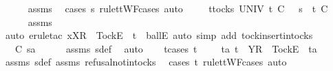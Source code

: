 \begin{isabellebody}
\ \ \ \ \isamarkupfalse%
\ assms{\isacharparenleft}{}{\isacharparenright}\ \isamarkupfalse%
\ {\isacharparenleft}cases\ s{}{\isacharprime}\ rule{\isacharcolon}ttWF{\isachardot}cases{\isacharcomma}\ auto{\isacharparenright}\isanewline
\ \ \isamarkupfalse%
\ {}{\isacharcolon}\ {\isachardoublequoteopen}{\isasymforall}t{\isasymin}tocks\ UNIV{\isachardot}\ t\ {\isasymle}\isactrlsub C\ {\isasymsigma}\ {\isacharat}\ s{}\ {\isasymlongrightarrow}\ t\ {\isasymle}\isactrlsub C\ {\isasymsigma}{\isachardoublequoteclose}\isanewline
\ \ \ \ \isamarkupfalse%
\ assms{\isacharparenleft}{}{\isacharparenright}\ \isamarkupfalse%
\ {\isacharparenleft}auto{\isacharcomma}\ erule{\isacharunderscore}tac\ x{\isacharequal}{\isachardoublequoteopen}{\isacharbrackleft}X{\isacharbrackright}\isactrlsub R\ {\isacharhash}\ {\isacharbrackleft}Tock{\isacharbrackright}\isactrlsub E\ {\isacharhash}\ t{\isachardoublequoteclose}\ \ ballE{\isacharcomma}\ auto\ simp\ add{\isacharcolon}\ tock{\isacharunderscore}insert{\isacharunderscore}in{\isacharunderscore}tocks{\isacharparenright}\isanewline
\ \ \isamarkupfalse%
\ {}{\isacharcolon}\ {\isachardoublequoteopen}{\isasymsigma}\ {\isasymsubseteq}\isactrlsub C\ s{}{\isacharprime}a{\isachardoublequoteclose}\isanewline
\ \ \ \ \isamarkupfalse%
\ assms{\isacharparenleft}{}{\isacharparenright}\ s{}{\isacharprime}{\isacharunderscore}def\ \isamarkupfalse%
\ auto\isanewline
\ \ \isamarkupfalse%
\ t{\isacharunderscore}cases{\isacharcolon}\ {\isachardoublequoteopen}t\ {\isacharequal}\ {\isacharbrackleft}{\isacharbrackright}\ {\isasymor}\ {\isacharparenleft}{\isasymexists}\ ta{\isachardot}\ t\ {\isacharequal}\ {\isacharbrackleft}Y{\isacharbrackright}\isactrlsub R\ {\isacharhash}\ {\isacharbrackleft}Tock{\isacharbrackright}\isactrlsub E\ {\isacharhash}\ ta{\isacharparenright}{\isachardoublequoteclose}\isanewline
\ \ \ \ \isamarkupfalse%
\ assms{\isacharparenleft}{}{\isacharparenright}\ s{}{\isacharprime}{\isacharunderscore}def\ assms{\isacharparenleft}{}{\isacharparenright}\ refusal{\isacharunderscore}notin{\isacharunderscore}tocks\ \isamarkupfalse%
\ {\isacharparenleft}cases\ t\ rule{\isacharcolon}ttWF{\isachardot}cases{\isacharcomma}\ auto{\isacharparenright}\isanewline
\ \ \isamarkupfalse%
\ \isamarkupfalse%

\end{isabellebody}
